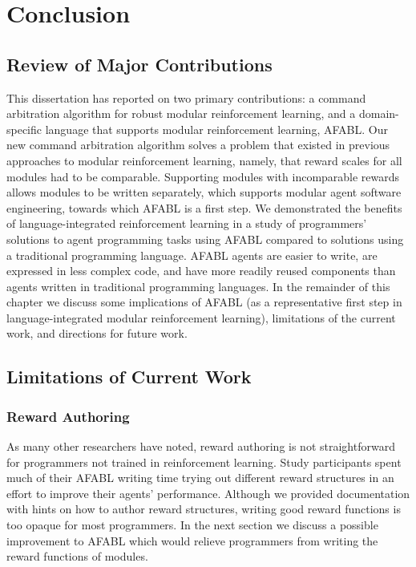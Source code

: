 \chapter{Conclusion}\label{ch:conclusion}

\section{Review of Major Contributions}

This dissertation has reported on two primary contributions: a command arbitration algorithm for robust modular reinforcement learning, and a domain-specific language that supports modular reinforcement learning, AFABL. Our new command arbitration algorithm solves a problem that existed in previous approaches to modular reinforcement learning, namely, that reward scales for all modules had to be comparable. Supporting modules with incomparable rewards allows modules to be written separately, which supports modular agent software engineering, towards which AFABL is a first step. We demonstrated the benefits of language-integrated reinforcement learning in a study of programmers' solutions to agent programming tasks using AFABL compared to solutions using a traditional programming language. AFABL agents are easier to write, are expressed in less complex code, and have more readily reused components than agents written in traditional programming languages. In the remainder of this chapter we discuss some implications of AFABL (as a representative first step in language-integrated modular reinforcement learning), limitations of the current work, and directions for future work.

\section{Limitations of Current Work}


\subsection{Reward Authoring}

As many other researchers have noted, reward authoring is not straightforward for programmers not trained in reinforcement learning. Study participants spent much of their AFABL writing time trying out different reward structures in an effort to improve their agents' performance. Although we provided documentation with hints on how to author reward structures, writing good reward functions is too opaque for most programmers. In the next section we discuss a possible improvement to AFABL which would relieve programmers from writing the reward functions of modules.

